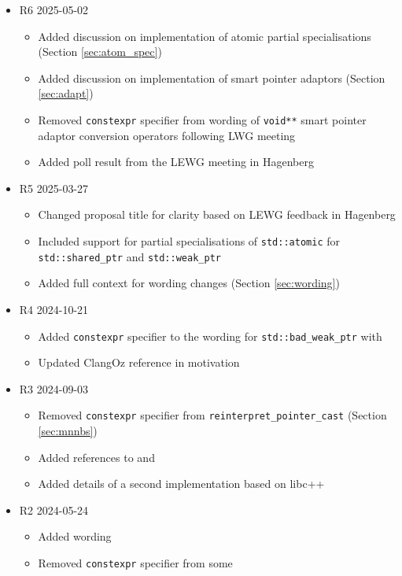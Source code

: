 \documentclass[10pt]{article}
\begin{document}
\begin{itemize}
\item R6 2025-05-02
  \begin{itemize}
  \item Added discussion on implementation of atomic partial specialisations (Section \ref{sec:atom_spec})
  \item Added discussion on implementation of smart pointer adaptors (Section \ref{sec:adapt})
  \item Removed \texttt{constexpr} specifier from wording of \texttt{void**} smart pointer adaptor conversion operators following LWG meeting
  \item Added poll result from the LEWG meeting in Hagenberg
  \end{itemize}
\item R5 2025-03-27
  \begin{itemize}
  \item Changed proposal title for clarity based on LEWG feedback in Hagenberg
  \item Included support for partial specialisations of \texttt{std::atomic} for \texttt{std::shared\_ptr} and \texttt{std::weak\_ptr}
  \item Added full context for wording changes (Section \ref{sec:wording})
  \end{itemize}
\item R4 2024-10-21
  \begin{itemize}
  \item Added \texttt{constexpr} specifier to the wording
        for \texttt{std::bad\_weak\_ptr} with \cite{P3068R6}
  \item Updated ClangOz reference in motivation
  \end{itemize}
\item R3 2024-09-03
  \begin{itemize}
  \item Removed \texttt{constexpr} specifier from
        \texttt{reinterpret\_pointer\_cast} (Section \ref{sec:mnnbs})
  \item Added references to \cite{P3309R3} and \cite{P3068R6}
  \item Added details of a second implementation based on libc++
  \end{itemize}
\item R2 2024-05-24
  \begin{itemize}
  \item Added wording
  \item Removed \texttt{constexpr} specifier from some

\end{itemize}
\end{itemize}
\end{document}
